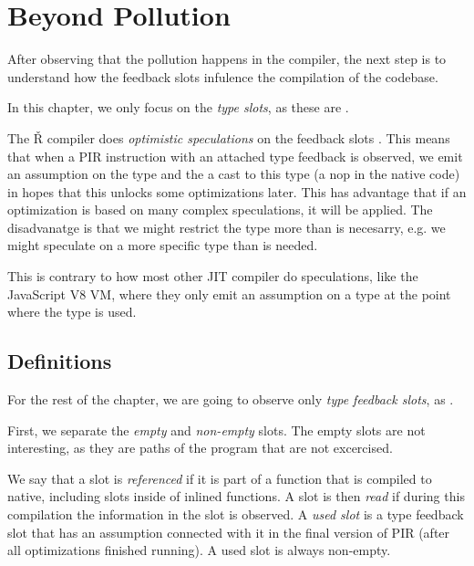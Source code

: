 \chapter{Beyond Pollution}


\begin{chapterabstract}
	\todoadd
\end{chapterabstract}

After observing that the pollution happens in the compiler, the next step is to understand how the feedback slots infulence the compilation of the codebase.


In this chapter, we only focus on the \textit{type slots}, as these are .

The Ř compiler does \textit{optimistic speculations} on the feedback slots . This means that when a PIR instruction with an attached type feedback is observed, we emit an assumption on the type and the a cast to this type (a nop in the native code) in hopes that this unlocks some optimizations later. This has advantage that if an optimization is based on many complex speculations, it will be applied. The disadvanatge is that we might restrict the type more than is necesarry, e.g. we might speculate on a more specific type than is needed.

This is contrary to how most other JIT compiler do speculations, like the JavaScript V8 VM\todocite, where they only emit an assumption on a type at the point where the type is used.

\section{Definitions}

For the rest of the chapter, we are going to observe only \textit{type feedback slots}, as .

First, we separate the \textit{empty} and \textit{non-empty} slots. The empty slots are not interesting, as they are paths of the program that are not excercised.

We say that a slot is \textit{referenced} if it is part of a function that is compiled to native, including slots inside of inlined functions. A slot is then \textit{read} if during this compilation the information in the slot is observed. A \textit{used slot} is a type feedback slot that has an assumption connected with it in the final version of PIR (after all optimizations finished running). A used slot is always non-empty.


